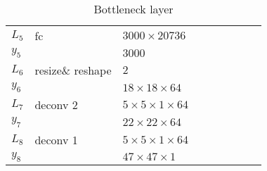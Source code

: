 \begin{table}[h!]
{\begin{tabular}{|lllllllll|}
			\multicolumn{1}{|l|}{$L_5$}   & fc               & \multicolumn{1}{l|}{$3000\times20736$}           &                & \multicolumn{1}{l|}{}                      \\
			\multicolumn{1}{|l|}{$y_5$}   &                  & \multicolumn{1}{l|}{$3000$}                      &                & \multicolumn{1}{l|}{}                      \\ \hline

			\multicolumn{1}{|l|}{$L_6$}   & resize\& reshape & \multicolumn{1}{l|}{$2$}                         &                & \multicolumn{1}{l|}{}                      \\
			\multicolumn{1}{|l|}{$y_6$}   &                  & \multicolumn{1}{l|}{$18\times18\times 64$}       &                & \multicolumn{1}{l|}{}                      \\ \hline

			\multicolumn{1}{|l|}{$L_7$}   & deconv 2         & \multicolumn{1}{l|}{$5\times 5\times1\times 64$} &                & \multicolumn{1}{l|}{}                      \\
			\multicolumn{1}{|l|}{$y_7$}   &                  & \multicolumn{1}{l|}{$22\times22\times64$}        &                & \multicolumn{1}{l|}{}                      \\ \hline


			\multicolumn{1}{|l|}{$L_8$}   & deconv 1         & \multicolumn{1}{l|}{$5\times 5\times1\times 64$} &                & \multicolumn{1}{l|}{}                      \\
			\multicolumn{1}{|l|}{$y_8$}   &                  & \multicolumn{1}{l|}{$47\times47\times1$}         &                & \multicolumn{1}{l|}{}                      \\ \hline
		\end{tabular}
		\caption{ \newline *Bottleneck layer} \label{tab:netIII}
	}
\end{table}

